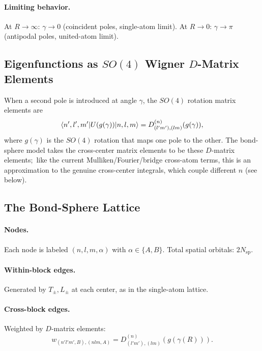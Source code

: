 \documentclass[aps,pra,twocolumn,superscriptaddress,longbibliography]{revtex4-2}
\theoremstyle{remark}
\theoremstyle{plain}
\begin{document}
\paragraph{Limiting behavior.}
At $R \to \infty$: $\gamma \to 0$ (coincident poles, single-atom limit).
At $R \to 0$: $\gamma \to \pi$ (antipodal poles, united-atom limit).

\subsection{Eigenfunctions as $SO(4)$ Wigner $D$-Matrix Elements}

When a second pole is introduced at angle $\gamma$, the $SO(4)$
rotation matrix elements are
\begin{equation}
\braket{n', l', m' | U(g(\gamma)) | n, l, m}
= D^{(n)}_{(l'm'),(lm)}(g(\gamma)),
\label{eq:D_matrix}
\end{equation}
where $g(\gamma)$ is the $SO(4)$ rotation that maps one pole to the
other.  The bond-sphere model takes the cross-center matrix elements to be
these $D$-matrix elements;\ like the current Mulliken/Fourier/bridge
cross-atom terms, this is an approximation to the genuine cross-center
integrals, which couple different $n$ (see below).

\subsection{The Bond-Sphere Lattice}

\paragraph{Nodes.}  Each node is labeled $(n, l, m, \alpha)$ with
$\alpha \in \{A, B\}$.  Total spatial orbitals: $2N_{\text{sp}}$.

\paragraph{Within-block edges.}  Generated by $T_\pm, L_\pm$ at each
center, as in the single-atom lattice.

\paragraph{Cross-block edges.}  Weighted by $D$-matrix elements:
\begin{equation}
w_{(n'l'm',B),(nlm,A)} = D^{(n)}_{(l'm'),(lm)}(g(\gamma(R))).
\label{eq:cross_weight}
\end{equation}
\end{document}
